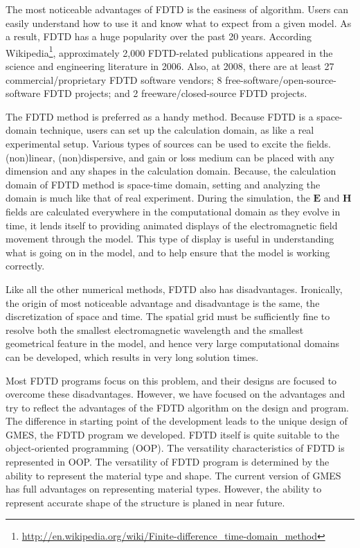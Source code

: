 The most noticeable advantages of FDTD is the easiness of algorithm. Users can easily understand how to use it and know what to expect from a given model. As a result, FDTD has a huge popularity over the past 20 years. According Wikipedia\footnote{\url{http://en.wikipedia.org/wiki/Finite-difference_time-domain_method}}, approximately 2,000 FDTD-related publications appeared in the science and engineering literature in 2006. Also, at 2008, there are at least 27 commercial/proprietary FDTD software vendors; 8 free-software/open-source-software FDTD projects; and 2 freeware/closed-source FDTD projects.

The FDTD method is preferred as a handy method. Because FDTD is a space-domain technique, users can set up the calculation domain, as like a real experimental setup. Various types of sources can be used to excite the fields. (non)linear, (non)dispersive, and gain or loss medium can be placed with any dimension and any shapes in the calculation domain. Because, the calculation domain of FDTD method is space-time domain, setting and analyzing the domain is much like that of real experiment. During the simulation, the $\mathbf{E}$ and $\mathbf{H}$ fields are calculated everywhere in the computational domain as they evolve in time, it lends itself to providing animated displays of the electromagnetic field movement through the model. This type of display is useful in understanding what is going on in the model, and to help ensure that the model is working correctly.

Like all the other numerical methods, FDTD also has disadvantages. Ironically, the origin of most noticeable advantage and disadvantage is the same, the discretization of space and time. The spatial grid must be sufficiently fine to resolve both the smallest electromagnetic wavelength and the smallest geometrical feature in the model, and hence very large computational domains can be developed, which results in very long solution times.

Most FDTD programs focus on this problem, and their designs are focused to overcome these disadvantages. However, we have focused on the advantages and try to reflect the advantages of the FDTD algorithm on the design and program. The difference in starting point of the development leads to the unique design of GMES, the FDTD program we developed. FDTD itself is quite suitable to the object-oriented programming (OOP). The versatility characteristics of FDTD is represented in OOP. The versatility of FDTD program is determined by the ability to represent the material type and shape. The current version of GMES has full advantages on representing material types. However, the ability to represent accurate shape of the structure is planed in near future.

